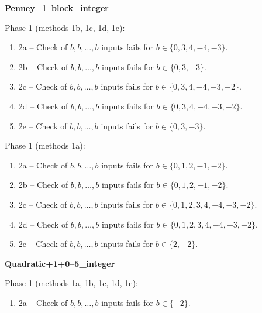 \begin{exmp}
\label{ex:compareAF}

\textbf{Penney\_1--block\_integer}

Phase 1 (methods 1b, 1c, 1d, 1e):
\begin{enumerate}[ ]
\item  2a -- Check of $b,b,\dots,b$ inputs fails for $b\in \{0, 3, 4, -4, -3\}$.
\item  2b -- Check of $b,b,\dots,b$ inputs fails for $b\in \{0, 3, -3\}$.
\item  2c -- Check of $b,b,\dots,b$ inputs fails for $b\in \{0, 3, 4, -4, -3, -2\}$.
\item  2d -- Check of $b,b,\dots,b$ inputs fails for $b\in \{0, 3, 4, -4, -3, -2\}$.
\item  2e -- Check of $b,b,\dots,b$ inputs fails for $b\in \{0, 3, -3\}$.
\end{enumerate}


Phase 1 (methods 1a):
\begin{enumerate}[ ]
\item  2a -- Check of $b,b,\dots,b$ inputs fails for $b\in \{0, 1, 2, -1, -2\}$.
\item  2b -- Check of $b,b,\dots,b$ inputs fails for $b\in \{0, 1, 2, -1, -2\}$.
\item  2c -- Check of $b,b,\dots,b$ inputs fails for $b\in \{0, 1, 2, 3, 4, -4, -3, -2\}$.
\item  2d -- Check of $b,b,\dots,b$ inputs fails for $b\in \{0, 1, 2, 3, 4, -4, -3, -2\}$.
\item  2e -- Check of $b,b,\dots,b$ inputs fails for $b\in \{2, -2\}$.
\end{enumerate}


\end{exmp}




\begin{exmp}
\label{ex:compareAK}

\textbf{Quadratic+1+0--5\_integer}

Phase 1 (methods 1a, 1b, 1c, 1d, 1e):
\begin{enumerate}[ ]
\item  2a -- Check of $b,b,\dots,b$ inputs fails for $b\in \{-2\}$.
\end{enumerate}


\end{exmp}




